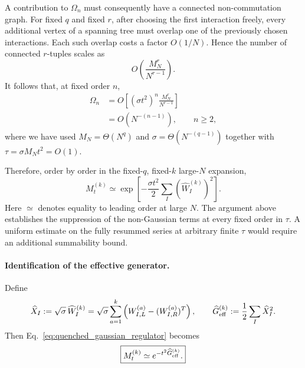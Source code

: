 \documentclass{article}
\theoremstyle{definition}
\begin{document}
A contribution to $\Omega_n$ must consequently have a connected
non-commutation graph.  For fixed $q$ and fixed $r$, after choosing the
first interaction freely, every additional vertex of a spanning tree must
overlap one of the previously chosen interactions.  Each such overlap costs
a factor $O(1/N)$.  Hence the number of connected $r$-tuples scales as
\begin{equation}
    O\left(
       \frac{M_N^r}{N^{r-1}}
    \right).
\end{equation}
It follows that, at fixed order $n$,
\begin{align}
    \Omega_n
    &=
    O\left[
       (\sigma t^2)^n
       \frac{M_N^r}{N^{r-1}}
    \right]
    \nonumber\\
    &=
    O(N^{-(n-1)}),
    \qquad
    n\geq2,
    \label{eq:quenched_Omegan_scaling}
\end{align}
where we have used $M_N=\Theta(N^q)$ and
$\sigma=\Theta(N^{-(q-1)})$ together with
$\tau=\sigma M_Nt^2=O(1)$.

Therefore, order by order in the fixed-$q$, fixed-$k$ large-$N$ expansion,
\begin{equation}
    M_t^{(k)}
    \simeq
    \exp\left[
       -\frac{\sigma t^2}{2}
       \sum_I
       \left(\widehat W_I^{(k)}\right)^2
    \right].
    \label{eq:quenched_gaussian_regulator}
\end{equation}
Here $\simeq$ denotes equality to leading order at large $N$.  The argument
above establishes the suppression of the non-Gaussian terms at every fixed
order in $\tau$.  A uniform estimate on the fully resummed series at
arbitrary finite $\tau$ would require an additional summability bound.

\paragraph{Identification of the effective generator.}
Define
\begin{equation}
    \widehat X_I
    :=
    \sqrt{\sigma}\,
    \widehat W_I^{(k)}
    =
    \sqrt{\sigma}
    \sum_{a=1}^k
    \left(
       W_{I,L}^{(a)}
       -
       (W_{I,R}^{(a)})^T
    \right),
    \qquad
    \widehat G_{\rm eff}^{(k)}
    :=
    \frac12\sum_I\widehat X_I^2.
    \label{eq:hatGeff_quenched}
\end{equation}
Then Eq.~\eqref{eq:quenched_gaussian_regulator} becomes
\begin{equation}
    \boxed{
    M_t^{(k)}
    \simeq
    e^{-t^2\widehat G_{\rm eff}^{(k)}}.
    }
    \label{eq:Mt_exp_hatGeff}
\end{equation}
\end{document}
